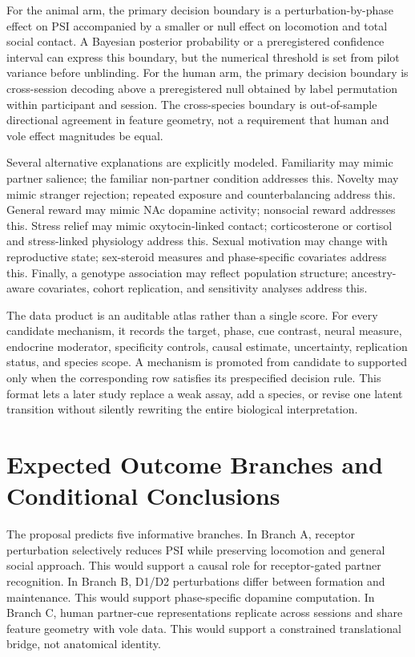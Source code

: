 \documentclass[conference]{IEEEtran}
\begin{document}
For the animal arm, the primary decision boundary is a perturbation-by-phase effect on PSI accompanied by a smaller or null effect on locomotion and total social contact. A Bayesian posterior probability or a preregistered confidence interval can express this boundary, but the numerical threshold is set from pilot variance before unblinding. For the human arm, the primary decision boundary is cross-session decoding above a preregistered null obtained by label permutation within participant and session. The cross-species boundary is out-of-sample directional agreement in feature geometry, not a requirement that human and vole effect magnitudes be equal.

Several alternative explanations are explicitly modeled. Familiarity may mimic partner salience; the familiar non-partner condition addresses this. Novelty may mimic stranger rejection; repeated exposure and counterbalancing address this. General reward may mimic NAc dopamine activity; nonsocial reward addresses this. Stress relief may mimic oxytocin-linked contact; corticosterone or cortisol and stress-linked physiology address this. Sexual motivation may change with reproductive state; sex-steroid measures and phase-specific covariates address this. Finally, a genotype association may reflect population structure; ancestry-aware covariates, cohort replication, and sensitivity analyses address this.

The data product is an auditable atlas rather than a single score. For every candidate mechanism, it records the target, phase, cue contrast, neural measure, endocrine moderator, specificity controls, causal estimate, uncertainty, replication status, and species scope. A mechanism is promoted from candidate to supported only when the corresponding row satisfies its prespecified decision rule. This format lets a later study replace a weak assay, add a species, or revise one latent transition without silently rewriting the entire biological interpretation.

\section{Expected Outcome Branches and Conditional Conclusions}
The proposal predicts five informative branches. In Branch A, receptor perturbation selectively reduces PSI while preserving locomotion and general social approach. This would support a causal role for receptor-gated partner recognition. In Branch B, D1/D2 perturbations differ between formation and maintenance. This would support phase-specific dopamine computation. In Branch C, human partner-cue representations replicate across sessions and share feature geometry with vole data. This would support a constrained translational bridge, not anatomical identity.
\end{document}
